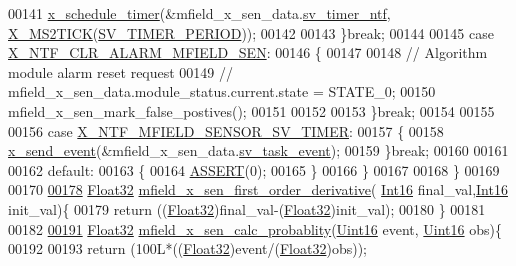 \begin{DoxyCode}
00141               \hyperlink{a00036_a9e3befaa21e83f196f74201deed85346}{x\_schedule\_timer}(&mfield\_x\_sen\_data.\hyperlink{a00025_ada91b200053f2d93e3639dc4ee3415b4}{sv\_timer\_ntf},
      \hyperlink{a00036_a1732cd929c486b3a225824bb2b3dba36}{X\_MS2TICK}(\hyperlink{a00023_a8a535456285f4602701c814d7b69cc68}{SV\_TIMER\_PERIOD}));
00142 
00143         \}\textcolor{keywordflow}{break};
00144 
00145          \textcolor{keywordflow}{case} \hyperlink{a00021_af3da43bd9d885f9c2a69ece8f997891b}{X\_NTF\_CLR\_ALARM\_MFIELD\_SEN}:
00146         \{
00147 
00148            \textcolor{comment}{// Algorithm module alarm reset request}
00149            \textcolor{comment}{//  mfield\_x\_sen\_data.module\_status.current.state = STATE\_0;}
00150              mfield\_x\_sen\_mark\_false\_postives();
00151 
00152 
00153         \}\textcolor{keywordflow}{break};
00154 
00155 
00156         \textcolor{keywordflow}{case} \hyperlink{a00025_ad9eede821e7c65d58f1806af4bd6bf29}{X\_NTF\_MFIELD\_SENSOR\_SV\_TIMER}:
00157         \{
00158            \hyperlink{a00036_a4bc3d03c8d62c8237329ed4e969fbc1b}{x\_send\_event}(&mfield\_x\_sen\_data.\hyperlink{a00025_a43c345f39ea3aefbb60ef1ef57fe5d83}{sv\_task\_event});
00159         \}\textcolor{keywordflow}{break};
00160 
00161 
00162         \textcolor{keywordflow}{default}:
00163         \{
00164             \hyperlink{a00072_abb8ff8e213ac9f6fb21d2b968583b936}{ASSERT}(0);
00165         \}
00166     \}
00167 
00168 \}
00169 
00170 
\hypertarget{a00050_source_l00178}{}\hyperlink{a00050_a3107eb45e1fcd2dcdfc54498c528a6a5}{00178} \hyperlink{a00072_a87d38f886e617ced2698fc55afa07637}{Float32} \hyperlink{a00050_a3107eb45e1fcd2dcdfc54498c528a6a5}{mfield\_x\_sen\_first\_order\_derivative}(
      \hyperlink{a00072_a659ce9e5eb6571f9984ffc7caad2660a}{Int16} final\_val,\hyperlink{a00072_a659ce9e5eb6571f9984ffc7caad2660a}{Int16} init\_val)\{
00179      \textcolor{keywordflow}{return} ((\hyperlink{a00072_a87d38f886e617ced2698fc55afa07637}{Float32})final\_val-(\hyperlink{a00072_a87d38f886e617ced2698fc55afa07637}{Float32})init\_val);
00180 \}
00181 
00182 
\hypertarget{a00050_source_l00191}{}\hyperlink{a00050_a51b6db21b0a9cbb8255cc4cfda81fad8}{00191} \hyperlink{a00072_a87d38f886e617ced2698fc55afa07637}{Float32} \hyperlink{a00050_a51b6db21b0a9cbb8255cc4cfda81fad8}{mfield\_x\_sen\_calc\_probablity}(\hyperlink{a00072_a59a9f6be4562c327cbfb4f7e8e18f08b}{Uint16} event,
      \hyperlink{a00072_a59a9f6be4562c327cbfb4f7e8e18f08b}{Uint16} obs)\{
00192 
00193     \textcolor{keywordflow}{return} (100L*((\hyperlink{a00072_a87d38f886e617ced2698fc55afa07637}{Float32})event/(\hyperlink{a00072_a87d38f886e617ced2698fc55afa07637}{Float32})obs));

\end{DoxyCode}
